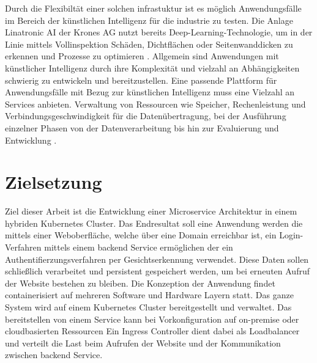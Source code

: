 Durch die Flexibiltät einer solchen infrastuktur ist es möglich Anwendungsfälle im Bereich
der künstlichen Intelligenz
für die industrie zu testen. Die Anlage Linatronic AI der Krones AG nutzt bereits Deep-Learning-Technologie,
um in der Linie mittels Vollinspektion Schäden, Dichtflächen oder Seitenwanddicken
zu erkennen und Prozesse zu optimieren \cite{linatronic}. Allgemein sind Anwendungen mit künstlicher Intelligenz durch ihre Komplexität
und vielzahl an Abhängigkeiten schwierig zu entwickeln und bereitzustellen. 
Eine passende Plattform für Anwendungsfälle mit Bezug zur künstlichen Intelligenz
muss eine Vielzahl an Services anbieten. Verwaltung von Ressourcen wie Speicher,
Rechenleistung und Verbindungsgeschwindigkeit für die Datenübertragung, 
bei der Ausführung einzelner Phasen von der Datenverarbeitung bis hin zur Evaluierung und Entwicklung
\cite{mlops}. 

\section{Zielsetzung}
Ziel dieser Arbeit ist die Entwicklung einer Microservice
Architektur in einem hybriden Kubernetes Cluster. Das Endresultat
soll eine Anwendung werden die mittels einer Weboberfläche, welche über eine Domain erreichbar ist,
ein Login-Verfahren mittels einem backend Service ermöglichen der ein Authentifierzungsverfahren
per Gesichtserkennung verwendet. 
Diese Daten sollen schließlich verarbeitet und persistent 
gespeichert werden, um bei erneuten Aufruf der Website bestehen zu bleiben.
Die Konzeption der Anwendung findet containerisiert auf mehreren Software und Hardware Layern
statt. 
Das ganze System wird auf einem Kubernetes Cluster bereitgestellt und verwaltet.
Das bereitstellen von einem Service kann bei Vorkonfiguration auf on-premise oder cloudbasierten Ressourcen 
Ein Ingress Controller dient dabei als Loadbalancer und verteilt die Last beim 
Aufrufen der Website und der Kommunikation zwischen backend Service.

